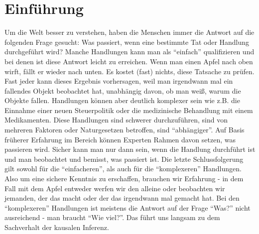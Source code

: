 \documentclass[12pt,a4paper,twoside]{scrartcl}
\numberwithin{equation}{section}
\begin{document}
\renewcommand\sectionmark[1]{\markboth{\thesection\quad\MakeUppercase{#1}}{\thesection\quad\MakeUppercase{#1}}}
\renewcommand\subsectionmark[1]{\markright{\thesubsection\quad\MakeUppercase{#1}}}

\tableofcontents
\clearpage
\listoffigures
\clearpage

\pagestyle{normal}

\section{Einführung}\label{sec:einführung}
Um die Welt besser zu verstehen, haben die Menschen immer die Antwort auf die folgenden Frage gesucht: Was passiert, wenn eine bestimmte Tat oder Handlung durchgeführt wird? Manche Handlungen kann man als \enquote{einfach} qualifizieren und bei denen ist diese Antwort leicht zu erreichen. Wenn man einen Apfel nach oben wirft, fällt er wieder nach unten. Es kostet (fast) nichts, diese Tatsache zu prüfen. Fast jeder kann dieses Ergebnis vorhersagen, weil man irgendwann mal ein fallendes Objekt beobachtet hat, unabhängig davon, ob man weiß, warum die Objekte fallen. Handlungen können aber deutlich komplexer sein wie z.B. die Einnahme einer neuen Steuerpolitik oder die medizinische Behandlung mit einem Medikamenten. Diese Handlungen sind schwerer durchzuführen, sind von mehreren Faktoren oder Naturgesetzen betroffen, sind \enquote{abhängiger}. Auf Basis früherer Erfahrung im Bereich können Experten Rahmen davon setzen, was passieren wird. Sicher kann man nur dann sein, wenn die Handlung durchführt ist und man beobachtet und bemisst, was passiert ist. Die letzte Schlussfolgerung gilt sowohl für die \enquote{einfacheren}, als auch für die \enquote{komplexeren} Handlungen. Also um eine sichere Kenntnis zu erschaffen, brauchen wir Erfahrung - in dem Fall mit dem Apfel entweder werfen wir den alleine oder beobachten wir jemanden, der das macht oder der das irgendwann mal gemacht hat. Bei den \enquote{komplexeren} Handlungen ist meistens die Antwort auf der Frage \enquote{Was?}  nicht ausreichend - man braucht \enquote{Wie viel?}. Das führt uns langsam zu dem Sachverhalt der kausalen Inferenz.      
\end{document}
